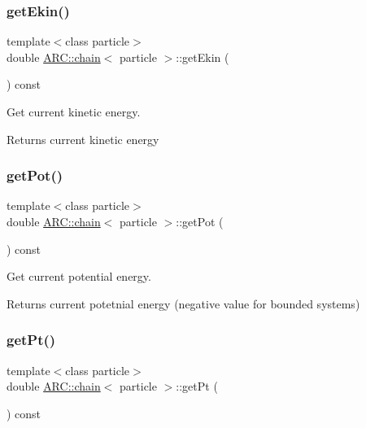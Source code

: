 \subsubsection{\texorpdfstring{get\+Ekin()}{getEkin()}}
{\footnotesize\ttfamily template$<$class particle$>$ \\
double \hyperlink{classARC_1_1chain}{A\+R\+C\+::chain}$<$ particle $>$\+::get\+Ekin (\begin{DoxyParamCaption}{ }\end{DoxyParamCaption}) const\hspace{0.3cm}{\ttfamily [inline]}}



Get current kinetic energy. 

\begin{DoxyReturn}{Returns}
current kinetic energy 
\end{DoxyReturn}
\hypertarget{classARC_1_1chain_ae59c00c676af34f22c650076eb0aa83a}{}\label{classARC_1_1chain_ae59c00c676af34f22c650076eb0aa83a} 
\subsubsection{\texorpdfstring{get\+Pot()}{getPot()}}
{\footnotesize\ttfamily template$<$class particle$>$ \\
double \hyperlink{classARC_1_1chain}{A\+R\+C\+::chain}$<$ particle $>$\+::get\+Pot (\begin{DoxyParamCaption}{ }\end{DoxyParamCaption}) const\hspace{0.3cm}{\ttfamily [inline]}}



Get current potential energy. 

\begin{DoxyReturn}{Returns}
current potetnial energy (negative value for bounded systems) 
\end{DoxyReturn}
\hypertarget{classARC_1_1chain_adbda281b80afe23f4b23d6a775046121}{}\label{classARC_1_1chain_adbda281b80afe23f4b23d6a775046121} 
\subsubsection{\texorpdfstring{get\+Pt()}{getPt()}}
{\footnotesize\ttfamily template$<$class particle$>$ \\
double \hyperlink{classARC_1_1chain}{A\+R\+C\+::chain}$<$ particle $>$\+::get\+Pt (\begin{DoxyParamCaption}{ }\end{DoxyParamCaption}) const\hspace{0.3cm}{\ttfamily [inline]}}



